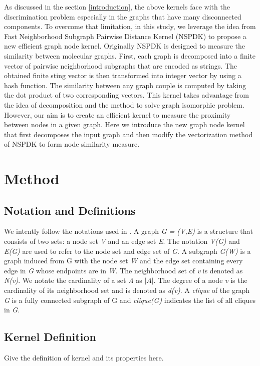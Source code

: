 \documentclass{esannV2}
\begin{document}
As discussed in the section \ref{introduction}, the above kernels face with the discrimination problem especially in the graphs that have many disconnected components. To overcome that limitation, in this study, we leverage the idea from Fast Neighborhood Subgraph Pairwise Distance Kernel (NSPDK) \cite{nspdk} to propose a new efficient graph node kernel. Originally NSPDK is designed to measure the similarity between molecular graphs. First, each graph is decomposed into a finite vector of pairwise neighborhood subgraphs that are encoded as strings. The obtained finite sting vector is then transformed into integer vector by using a hash function. The similarity between any graph couple is computed by taking the dot product of two corresponding vectors. This kernel takes advantage from the idea of decomposition and the method to solve graph isomorphic problem. However, our aim is to create an efficient kernel to measure the proximity between nodes in a given graph. Here we introduce the new graph node kernel that first decomposes the input graph and then modify the vectorization method of NSPDK to form node similarity measure.
\section{Method}\label{method}
\subsection{Notation and Definitions}
We intently follow the notations used in \cite{nspdk}. A graph \textit{G = (V,E)} is a structure that consists of two sets: a node set \textit{V} and an edge set \textit{E}. The notation \textit{V(G)} and \textit{E(G)} are used to refer to the node set and edge set of \textit{G}. A subgraph \textit{G(W)} is a graph induced from G with the node set \textit{W} and the edge set containing every edge in \textit{G} whose endpoints  are in \textit{W}. The neighborhood set of \textit{v} is denoted as \textit{N(v)}. We notate the cardinality of a set \textit{A} as $|A|$. The degree of a node \textit{v} is the cardinality of its neighborhood set and is denoted as \textit{d(v)}. A \textit{clique} of the graph \textit{G} is a fully connected subgraph of G and \textit{clique(G)} indicates the list of all cliques in \textit{G}.
\subsection{Kernel Definition}
Give the definition of kernel and its properties here.
\end{document}
